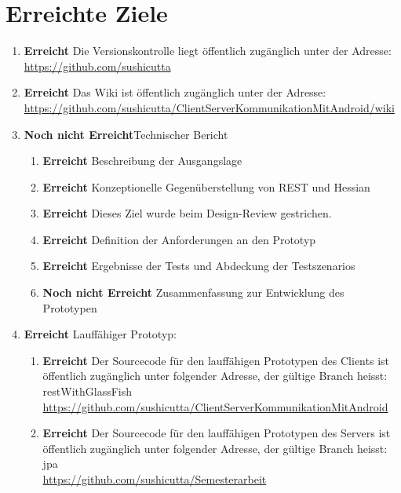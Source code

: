 \documentclass[abstracton, listof=totocnumbered,
bibliography=totocnumbered]{scrreprt}
\begin{document}
  \newpage  
  
  \chapter{Erreichte Ziele}
  
  \begin{enumerate}
    \item \textbf{Erreicht} Die Versionskontrolle liegt öffentlich zugänglich unter der
          Adresse:\\
          \url{https://github.com/sushicutta}
    \item \textbf{Erreicht} Das Wiki ist öffentlich zugänglich unter der
          Adresse:\\
          \url{https://github.com/sushicutta/ClientServerKommunikationMitAndroid/wiki}
    \item \textbf{Noch nicht Erreicht}Technischer Bericht
    \begin{enumerate}
      \item \textbf{Erreicht} Beschreibung der Ausgangslage
      \item \textbf{Erreicht} Konzeptionelle Gegenüberstellung von \ac{REST} und
            Hessian
      \item \textbf{Erreicht} Dieses Ziel wurde beim Design-Review gestrichen. 
      \item \textbf{Erreicht} Definition der Anforderungen an den Prototyp
      \item \textbf{Erreicht} Ergebnisse der Tests und Abdeckung der Testszenarios
      \item \textbf{Noch nicht Erreicht} Zusammenfassung zur Entwicklung des
            Prototypen
    \end{enumerate}
    \item \textbf{Erreicht} Lauffähiger Prototyp:
    \begin{enumerate}
      \item \textbf{Erreicht} Der Sourcecode für den lauffähigen Prototypen des
      Clients ist öffentlich zugänglich unter folgender Adresse, der gültige Branch
      heisst: restWithGlassFish\\
      \url{https://github.com/sushicutta/ClientServerKommunikationMitAndroid}
      \item \textbf{Erreicht} Der Sourcecode für den lauffähigen Prototypen des
      Servers ist öffentlich zugänglich unter folgender Adresse, der gültige Branch
      heisst: jpa\\
      \url{https://github.com/sushicutta/Semesterarbeit}
    \end{enumerate}
  \end{enumerate}
  
\end{document}
